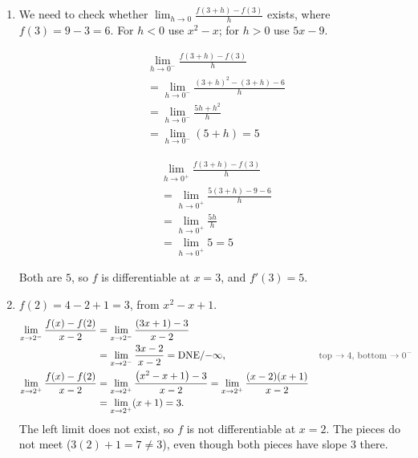 \documentclass[11pt,a4paper]{article}
\newcommand{\DNEinf}{\ensuremath{\text{DNE}/\infty}}
\newcommand{\DNEninf}{\ensuremath{\text{DNE}/{-\infty}}}
\newcommand{\why}[1]{\text{\small\color{darkgray}#1}}
\newcommand{\twosides}[2]{\par\smallskip\noindent\begin{minipage}[t]{0.47\linewidth}#1\end{minipage}\hfill{\color{rulegray}\vrule width 0.6pt}\hfill\begin{minipage}[t]{0.47\linewidth}#2\end{minipage}\par\smallskip}
\begin{document}
{\begin{enumerate}[label=(\alph*)]
 Differentiability: we need to check whether $\displaystyle\lim_{h\to0}\frac{g(-2+h)-g(-2)}{h}$ exists. Split it into the two one-sided limits.
 \twosides{%
 \begin{align*}
 &\lim_{h\to0^-}\frac{g(-2+h)-g(-2)}{h}\\
 &=\lim_{h\to0^-}\frac{\sqrt{|h|}-3+3}{h}=\lim_{h\to0^-}\frac{\sqrt{-h}}{h}\\
 &=\lim_{h\to0^-}\frac{-1}{\sqrt{-h}}=\DNEninf
 \end{align*}}{%
 \begin{align*}
 &\lim_{h\to0^+}\frac{g(-2+h)-g(-2)}{h}\\
 &=\lim_{h\to0^+}\frac{\sqrt{|h|}-3+3}{h}=\lim_{h\to0^+}\frac{\sqrt h}{h}\\
 &=\lim_{h\to0^+}\frac{1}{\sqrt h}=\DNEinf
 \end{align*}}
 The one-sided limits are not finite, so $g$ is continuous but not differentiable at $x=-2$ (a cusp).
 \item We need to check whether $\displaystyle\lim_{h\to0}\frac{f(3+h)-f(3)}{h}$ exists, where $f(3)=9-3=6$. For $h<0$ use $x^2-x$; for $h>0$ use $5x-9$.
 \twosides{%
 \begin{align*}
 &\lim_{h\to0^-}\frac{f(3+h)-f(3)}{h}\\
 &=\lim_{h\to0^-}\frac{(3+h)^2-(3+h)-6}{h}\\
 &=\lim_{h\to0^-}\frac{5h+h^2}{h}\\
 &=\lim_{h\to0^-}(5+h)=5
 \end{align*}}{%
 \begin{align*}
 &\lim_{h\to0^+}\frac{f(3+h)-f(3)}{h}\\
 &=\lim_{h\to0^+}\frac{5(3+h)-9-6}{h}\\
 &=\lim_{h\to0^+}\frac{5h}{h}\\
 &=\lim_{h\to0^+}5=5
 \end{align*}}
 Both are $5$, so $f$ is differentiable at $x=3$, and $f'(3)=5$.
 \item $f(2)=4-2+1=3$, from $x^2-x+1$.
 \begin{align*}
 \lim_{x\to2^-}\frac{f(x)-f(2)}{x-2}&=\lim_{x\to2^-}\frac{(3x+1)-3}{x-2}\\
 &=\lim_{x\to2^-}\frac{3x-2}{x-2}=\DNEninf, &&\why{top $\to4$, bottom $\to0^-$}\\
 \lim_{x\to2^+}\frac{f(x)-f(2)}{x-2}&=\lim_{x\to2^+}\frac{\bigl(x^2-x+1\bigr)-3}{x-2}=\lim_{x\to2^+}\frac{(x-2)(x+1)}{x-2}\\
 &=\lim_{x\to2^+}(x+1)=3.
 \end{align*}
 The left limit does not exist, so $f$ is not differentiable at $x=2$. The pieces do not meet ($3(2)+1=7\ne3$), even though both pieces have slope $3$ there.
\end{enumerate}
}
\end{document}
